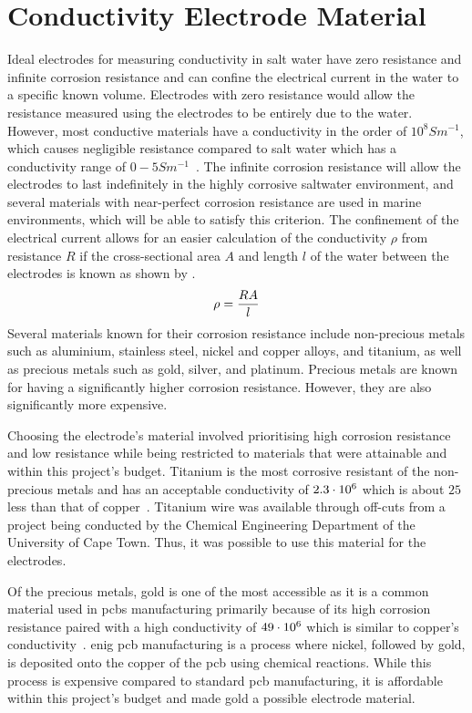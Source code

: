 \section{Conductivity Electrode Material}

Ideal electrodes for measuring conductivity in salt water have zero resistance and infinite corrosion resistance and can confine the electrical current in the water to a specific known volume.
Electrodes with zero resistance would allow the resistance measured using the electrodes to be entirely due to the water.
However, most conductive materials have a conductivity in the order of $10^8 Sm^{-1}$, which causes negligible resistance compared to salt water which has a conductivity range of $0-5 Sm^{-1}$~\cite{as_typical_conductivity_2022}.
The infinite corrosion resistance will allow the electrodes to last indefinitely in the highly corrosive saltwater environment, and several materials with near-perfect corrosion resistance are used in marine environments, which will be able to satisfy this criterion.
The confinement of the electrical current allows for an easier calculation of the conductivity $\rho$ from resistance $R$ if the cross-sectional area $A$ and length $l$ of the water between the electrodes is known as shown by .
\begin{equation}
    \rho = \frac{\displaystyle RA}{\displaystyle l}
    \label{eqn:conductivity-from-resistance}
\end{equation}
Several materials known for their corrosion resistance include non-precious metals such as aluminium, stainless steel, nickel and copper alloys, and titanium, as well as precious metals such as gold, silver, and platinum.
Precious metals are known for having a significantly higher corrosion resistance. 
However, they are also significantly more expensive.

Choosing the electrode's material involved prioritising high corrosion resistance and low resistance while being restricted to materials that were attainable and within this project's budget.
Titanium is the most corrosive resistant of the non-precious metals and has an acceptable conductivity of $2.3\cdot10^{6}$ which is about $25$ less than that of copper~\cite{walsh_electrodes_conductivity_1991}.
Titanium wire was available through off-cuts from a project being conducted by the Chemical Engineering Department of the University of Cape Town. 
Thus, it was possible to use this material for the electrodes.

Of the precious metals, gold is one of the most accessible as it is a common material used in \glspl{pcb} manufacturing primarily because of its high corrosion resistance paired with a high conductivity of $49\cdot10^{6}$ which is similar to copper's conductivity~\cite{walsh_electrodes_conductivity_1991}.
\gls{enig} \gls{pcb} manufacturing is a process where nickel, followed by gold, is deposited onto the copper of the \gls{pcb} using chemical reactions.
While this process is expensive compared to standard \gls{pcb} manufacturing, it is affordable within this project's budget and made gold a possible electrode material.

